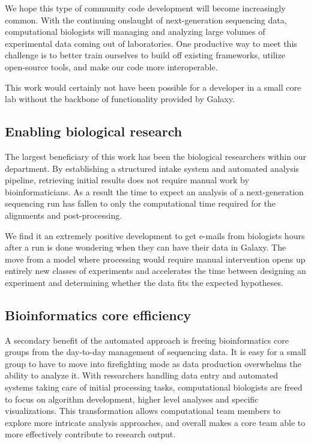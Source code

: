 \documentclass[10pt]{bmc_article}
\newenvironment{bmcformat}{\begin{raggedright}\baselineskip20pt\sloppy\setboolean{publ}{false}}{\end{raggedright}\baselineskip20pt\sloppy}
\begin{document}
\begin{bmcformat}
We hope this type of community code development will become
increasingly common. With the continuing onslaught of next-generation
sequencing data, computational biologists will managing and analyzing
large volumes of experimental data coming out of laboratories. One
productive way to meet this challenge is to better train ourselves to
build off existing frameworks, utilize open-source tools, and make our
code more interoperable.

This work would certainly not have been possible for a developer in a
small core lab without the backbone of functionality provided by
Galaxy.

\subsection*{Enabling biological research}

The largest beneficiary of this work has been the biological
researchers within our department. By establishing a structured intake
system and automated analysis pipeline, retrieving initial results
does not require manual work by bioinformaticians. As a result
the time to expect an analysis of a next-generation sequencing run has
fallen to only the computational time required for the alignments and
post-processing.

We find it an extremely positive development to get e-mails from
biologists hours after a run is done wondering when they can have
their data in Galaxy. The move from a model where processing would
require manual intervention opens up entirely new classes of
experiments and accelerates the time between designing an experiment
and determining whether the data fits the expected hypotheses.

\subsection*{Bioinformatics core efficiency}

A secondary benefit of the automated approach is freeing
bioinformatics core groups from the day-to-day management of
sequencing data. It is easy for a small group to have to move into
firefighting mode as data production overwhelms the ability to
analyze it. With researchers handling data entry and automated systems
taking care of initial processing tasks, computational biologists are
freed to focus on algorithm development, higher level analyses and
specific visualizations. This transformation allows computational team
members to explore more intricate analysis approaches, and overall
makes a core team able to more effectively contribute to research
output.


\end{bmcformat}
\end{document}
